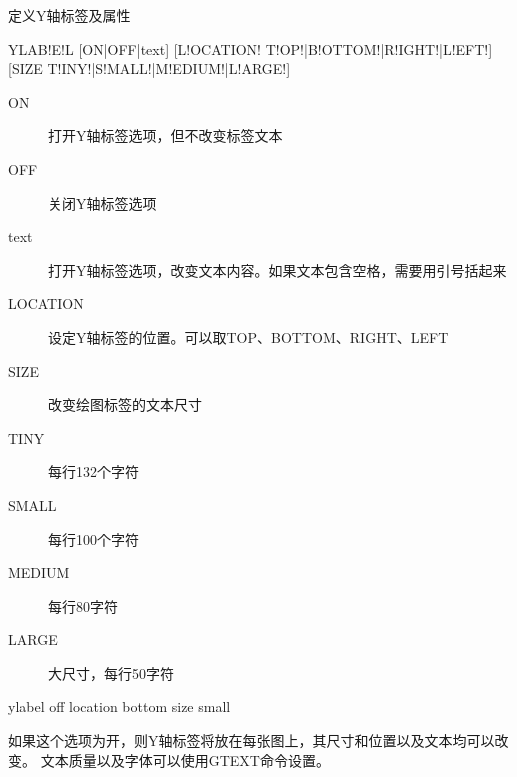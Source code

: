 \label{cmd:ylabel}

定义Y轴标签及属性

\begin{SACSTX}
YLAB!E!L [ON|OFF|text] [L!OCATION! T!OP!|B!OTTOM!|R!IGHT!|L!EFT!]
    [SIZE T!INY!|S!MALL!|M!EDIUM!|L!ARGE!]
\end{SACSTX}

\begin{description}
\item [ON] 打开Y轴标签选项，但不改变标签文本
\item [OFF] 关闭Y轴标签选项
\item [text] 打开Y轴标签选项，改变文本内容。如果文本包含空格，需要用引号括起来
\item [LOCATION] 设定Y轴标签的位置。可以取TOP、BOTTOM、RIGHT、LEFT
\item [SIZE] 改变绘图标签的文本尺寸
\item [TINY] 每行132个字符
\item [SMALL] 每行100个字符
\item [MEDIUM] 每行80字符
\item [LARGE] 大尺寸，每行50字符
\end{description}

\begin{SACDFT}
ylabel off location bottom size small
\end{SACDFT}

如果这个选项为开，则Y轴标签将放在每张图上，其尺寸和位置以及文本均可以改变。
文本质量以及字体可以使用GTEXT命令设置。
